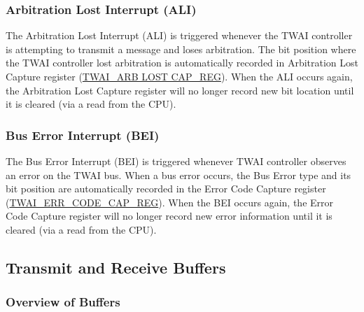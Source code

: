 \documentclass[main\_\_EN.tex]{subfiles}
\begin{document}
\subsubsection{Arbitration Lost Interrupt (ALI)}
The Arbitration Lost Interrupt (ALI) is triggered whenever the TWAI controller is attempting to transmit a message and loses arbitration. The bit position where the TWAI controller lost arbitration is automatically recorded in Arbitration Lost Capture register (\hyperref[regdesc:TWAIARB LOST CAPREG]{TWAI\_ARB LOST CAP\_REG}). When the ALI occurs again, the Arbitration Lost Capture register will no longer record new bit location until it is cleared (via a read from the CPU).

\subsubsection{Bus Error Interrupt (BEI)}
The Bus Error Interrupt (BEI) is triggered whenever TWAI controller observes an error on the TWAI bus. When a bus error occurs, the Bus Error type and its bit position are automatically recorded in the Error Code Capture register (\hyperref[regdesc:TWAIERRCODECAPREG]{TWAI\_ERR\_CODE\_CAP\_REG}). When the BEI occurs again, the Error Code Capture register will no longer record new error information until it is cleared (via a read from the CPU).


\subsection{Transmit and Receive Buffers}
\subsubsection{Overview of Buffers}
\end{document}
